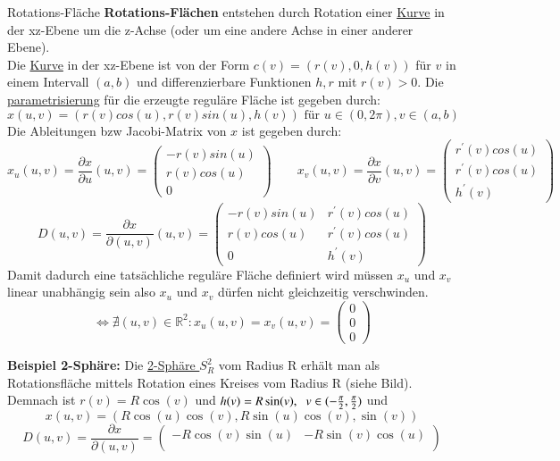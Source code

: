 \begin{titleDef}{Rotations-Fläche}
\label{rotFlaeche}
\textbf{Rotations-Flächen} entstehen durch Rotation einer \hyperref[kurve]{Kurve} in der xz-Ebene um die z-Achse (oder um eine andere Achse in einer anderer Ebene).\\
Die \hyperref[kurve]{Kurve} in der xz-Ebene ist von der Form $c(v)=(r(v),0,h(v))$ für $v$ in einem Intervall $(a,b)$ und differenzierbare Funktionen $h,r$ mit $r(v)>0$.
Die \hyperref[parametrisierung]{parametrisierung} für die erzeugte reguläre Fläche ist gegeben durch:
$$x(u,v)=(r(v)cos(u),r(v)sin(u),h(v)) \text{  für  } u\in(0,2\pi),v\in(a,b)$$ 
Die Ableitungen bzw Jacobi-Matrix von $x$ ist gegeben durch:
$$x_u(u,v)=\frac{\partial x}{\partial u}(u,v)=
\begin{pmatrix} -r(v)sin(u)\\r(v)cos(u)\\0\end{pmatrix}\qquad
x_v(u,v)=\frac{\partial x}{\partial v}(u,v)=
\begin{pmatrix} r^\prime(v)cos(u)\\r^\prime(v)cos(u)\\h^\prime(v)\end{pmatrix}$$
$$D(u,v)=\frac{\partial x}{\partial(u,v)}(u,v)=
\begin{pmatrix}
	-r(v)sin(u)&r^\prime(v)cos(u)\\
	r(v)cos(u)&	r^\prime(v)cos(u)\\
	0&h^\prime(v)
\end{pmatrix}$$
Damit dadurch eine tatsächliche reguläre Fläche definiert wird müssen $x_u$ und $x_v$ linear unabhängig sein also $x_u$ und $x_v$ dürfen nicht gleichzeitig verschwinden.\\
$$\Leftrightarrow \nexists(u,v)\in\mathbb{R}^2:x_u(u,v)=x_v(u,v)=\begin{pmatrix}0\\0\\0\end{pmatrix}$$\par
\textbf{Beispiel 2-Sphäre:} Die \hyperref[sphere]{2-Sphäre $S^2_R$} vom Radius R erhält man als Rotationsfläche mittels Rotation eines Kreises vom Radius R (siehe Bild).\\
Demnach ist $r(v)=R\cos(v)$ und $h(v)=R\sin(v),\;\; v\in(-\pihalf,\pihalf)$ und 
$$x(u,v)=(R\cos(u)\cos(v),R\sin(u)\cos(v),\sin(v))$$
$$D(u,v)=\frac{\partial x}{\partial(u,v)}=\begin{pmatrix}
	-R\cos(v)\sin(u)&-R\sin(v)\cos(u)\\

\end{pmatrix}$$
\end{titleDef}
